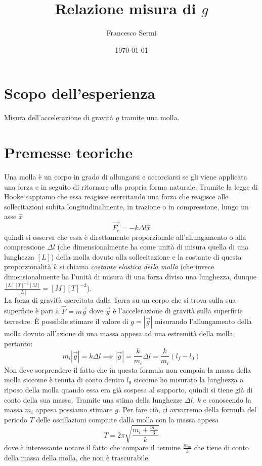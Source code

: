 \documentclass{article}
\title{Relazione misura di $g$}
\author{Francesco Sermi}
\date{\today}
\begin{document}
\maketitle

\section{Scopo dell'esperienza}
Misura dell'accelerazione di gravità $g$ tramite una molla.

\section{Premesse teoriche}
Una molla è un corpo in grado di allungarsi e accorciarsi se gli viene applicata una forza e in seguito di ritornare alla propria forma naturale. Tramite la legge di Hooke sappiamo che essa reagisce esercitando una forza che reagisce alle sollecitazioni subita longitudinalmente, in trazione o in compressione, lungo un asse $\hat{x}$
\begin{equation}
\vec{F_e} = - k \Delta l \hat{x}
\end{equation}
quindi si osserva che essa è direttamente proporzionale all'allungamento o alla compressione $\Delta l$ (che dimensionalmente ha come unità di misura quella di una lunghezza $[L]$) della molla dovuto alla sollecitazione e la costante di questa proporzionalità $k$ si chiama \emph{costante elastica della molla} (che invece dimensionalmente ha l'unità di misura di una forza diviso una lunghezza, dunque $\frac{[L][T]^{-2}[M]}{[L]} = [M][T]^{-2}$). \\
La forza di gravità esercitata dalla Terra su un corpo che si trova sulla sua superficie è pari a
$\vec{F} = m\vec{g}$
dove $\vec{g}$ è l'accelerazione di gravità sulla superficie terrestre. È possibile stimare il valore di $g=|\vec{g}|$ misurando l'allungamento della molla dovuto all'azione di una massa appesa ad una estremità della molla, pertanto:
\begin{equation}
	m_i|\vec{g}| = k \Delta l \implies |\vec{g}| = \frac{k}{m_i} \Delta l = \frac{k}{m_i} (l_f - l_0)
	\label{secondo_modello}
\end{equation}
Non deve sorprendere il fatto che in questa formula non compaia la massa della molla siccome è tenuta di conto dentro $l_0$ siccome ho misurato la lunghezza a riposo della molla quando essa era già sospesa al supporto, quindi si tiene già di conto della sua massa.
Tramite una stima della lunghezze $\Delta l$, $k$ e conoscendo la massa $m_i$ appesa possiamo stimare $g$. Per fare ciò, ci avvarremo della formula del periodo $T$ delle oscillazioni compiute dalla molla con la massa appesa
\begin{equation}
	T = 2 \pi \sqrt{\frac{m_i+\frac{m_m}{3}}{k}}
	\label{primo_modello}
\end{equation}
dove è interessante notare il fatto che compare il termine $\frac{m_m}{3}$ che tiene di conto della massa della molla, che non è trascurabile.
\end{document}
